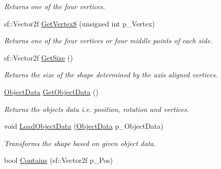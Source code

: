 \begin{DoxyCompactItemize}
\begin{DoxyCompactList}\small\item\em Returns one of the four vertices. \end{DoxyCompactList}\item 
\mbox{\label{class_quad_part_a978cb59cb2c4e3407421cef33f8f02d3}} 
sf\+::\+Vector2f \hyperlink{class_quad_part_a978cb59cb2c4e3407421cef33f8f02d3}{Get\+Vertex8} (unsigned int p\+\_\+\+Vertex)
\begin{DoxyCompactList}\small\item\em Returns one of the four vertices or four middle points of each side. \end{DoxyCompactList}\item 
\mbox{\label{class_quad_part_af2fa5ea599fa1f615594ff7de7914b2f}} 
sf\+::\+Vector2f \hyperlink{class_quad_part_af2fa5ea599fa1f615594ff7de7914b2f}{Get\+Size} ()
\begin{DoxyCompactList}\small\item\em Returns the size of the shape determined by the axis aligned vertices. \end{DoxyCompactList}\item 
\mbox{\label{class_quad_part_a385dadc4c3fc18850ce4767cf9b6d4d1}} 
\hyperlink{class_object_data}{Object\+Data} \hyperlink{class_quad_part_a385dadc4c3fc18850ce4767cf9b6d4d1}{Get\+Object\+Data} ()
\begin{DoxyCompactList}\small\item\em Returns the objects data i.\+e. position, rotation and vertices. \end{DoxyCompactList}\item 
\mbox{\label{class_quad_part_a535018d0d56f62b8b81b0ba20e5df85e}} 
void \hyperlink{class_quad_part_a535018d0d56f62b8b81b0ba20e5df85e}{Load\+Object\+Data} (\hyperlink{class_object_data}{Object\+Data} p\+\_\+\+Object\+Data)
\begin{DoxyCompactList}\small\item\em Transforms the shape based on given object data. \end{DoxyCompactList}\item 
\mbox{\label{class_quad_part_af7c03b4820eb97c2041d858c3887bb32}} 
bool \hyperlink{class_quad_part_af7c03b4820eb97c2041d858c3887bb32}{Contains} (sf\+::\+Vector2f p\+\_\+\+Pos)

\end{DoxyCompactItemize}
